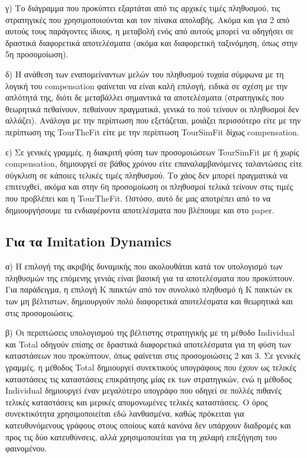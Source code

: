 \documentclass[12pt]{article}
\begin{document}
γ) Το διάγραμμα που προκύπτει εξαρτάται από τις αρχικές τιμές πληθυσμού, τις στρατηγικές που χρησιμοποιούνται και τον πίνακα απολαβής. Ακόμα και για 2 από αυτούς τους παράγοντες ίδιους, η μεταβολή ενός από αυτούς μπορεί να οδηγήσει σε δραστικά διαφορετικά αποτελέσματα (ακόμα και διαφορετική ταξινόμηση, όπως στην 5η προσομοίωση).

δ) Η ανάθεση των εναπομείναντων μελών του πληθυσμού τυχαία σύμφωνα με τη λογική του compensation φαίνεται να είναι καλή επιλογή, ειδικά σε σχέση με την απλότητά της, διότι δε μεταβάλλει σημαντικά τα αποτελέσματα (στρατηγικές που θεωρητικά πεθαίνουν, πεθαίνουν πραγματικά, γενικά το πού τείνουν οι πληθυσμοί δεν αλλάζει). Ανάλογα με την περίπτωση που εξετάζεται, μοιάζει περισσότερο είτε με την περίπτωση της TourTheFit είτε με την περίπτωση TourSimFit δίχως compensation.

ε) Σε γενικές γραμμές, η διακριτή φύση των προσομοιώσεων TourSimFit με ή χωρίς compensation, δημιουργεί σε βάθος χρόνου είτε επαναλαμβανόμενες ταλαντώσεις είτε σύγκλιση σε κάποιες τελικές τιμές πληθυσμού. Το χάος δεν μπορεί πραγματικά να επιτευχθεί, ακόμα και στην 6η προσομοίωση οι πληθυσμοί τελικά τείνουν στις τιμές που προβλέπει και η TourTheFit. Ωστόσο, αυτό δε μας αποτρέπει από το να δημιουργήσουμε τα ενδιαφέροντα αποτελέσματα που βλέπουμε και στο paper.

\subsection*{Για τα Imitation Dynamics}
α) Η επιλογή της ακριβής δυναμικής που ακολουθάται κατά τον υπολογισμό των πληθυσμών της επόμενης γενιάς είναι βασική για τα αποτελέσματα που προκύπτουν. Για παράδειγμα, η επιλογή K παικτών από τον συνολικό πληθυσμό ή K παικτών εκ των μη βέλτιστων, δημιουργούν πολύ διαφορετικά αποτελέσματα και θεωρητικά και στις προσομοιώσεις.

β) Οι περιπτώσεις υπολογισμού της βέλτιστης στρατηγικής με τη μέθοδο In\-di\-vi\-du\-al και Total οδηγούν επίσης σε δραστικά διαφορετικά αποτελέσματα για τη φύση των καταστάσεων που προκύπτουν, όπως φαίνεται στις προσομοιώσεις 2 και 3. Σε γενικές γραμμές, η μέθοδος Total δημιουργεί συνεκτικούς υπογράφους που έχουν ως τελικές καταστάσεις τις καταστάσεις επικράτησης μίας εκ των στρατηγικών, ενώ η μέθοδος Individual δημιουργεί έναν μεγαλύτερο υπογράφο που οδηγεί σε πολλές πιθανές τελικές καταστάσεις και μερικές απομονωμένες τελικές καταστάσεις. Ο όρος συνεκτικότητα χρησιμοποιείται εδώ λανθασμένα, καθώς πρόκειται για κατευθυνόμενους γράφους στους οποίους κατά κανόνα δεν υπάρχουν διαδρομές και προς τις δύο κατευθύνσεις, αλλά χρησιμοποιείται για τη χαλαρή επεξήγηση του φαινομένου.
\end{document}
